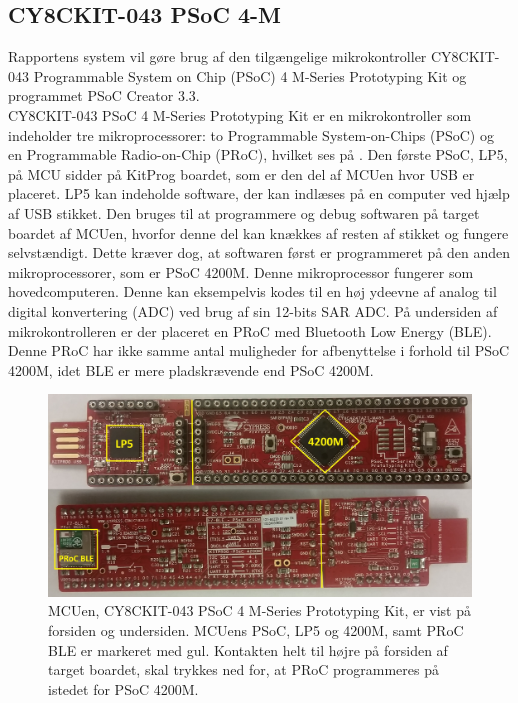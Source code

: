 \subsection{CY8CKIT-043 PSoC 4-M}
Rapportens system vil gøre brug af den tilgængelige mikrokontroller CY8CKIT-043 Programmable System on Chip (PSoC) 4 M-Series Prototyping Kit og programmet PSoC Creator 3.3.\\
CY8CKIT-043 PSoC 4 M-Series Prototyping Kit er en mikrokontroller som indeholder tre mikroprocessorer: to Programmable System-on-Chips (PSoC) og en Programmable Radio-on-Chip (PRoC), hvilket ses på . Den første PSoC, LP5, på MCU sidder på KitProg boardet, som er den del af MCUen hvor USB er placeret. LP5 kan indeholde software, der kan indlæses på en computer ved hjælp af USB stikket. Den bruges til at programmere og debug softwaren på target boardet af MCUen, hvorfor denne del kan knækkes af resten af stikket og fungere selvstændigt. Dette kræver dog, at softwaren først er programmeret på den anden mikroprocessorer, som er PSoC 4200M. Denne mikroprocessor fungerer som hovedcomputeren. Denne kan eksempelvis kodes til en høj ydeevne af analog til digital konvertering (ADC) ved brug af sin 12-bits SAR ADC. \newline
På undersiden af mikrokontrolleren er der placeret en PRoC med Bluetooth Low Energy (BLE). Denne PRoC har ikke samme antal muligheder for afbenyttelse i forhold til PSoC 4200M, idet BLE er mere pladskrævende end PSoC 4200M. \citep{CYPRESS2016PSoC,Semiconductor2016,CYPRESS2016Cortexm0}
%
\begin{figure}[H]
	\centering
	\includegraphics[scale=0.15]{figures/bProblemloesning/PSoC3.jpg}
	\caption{MCUen, CY8CKIT-043 PSoC 4 M-Series Prototyping Kit, er vist på forsiden og undersiden. MCUens PSoC, LP5 og 4200M, samt PRoC BLE er markeret med gul.\newline
	 Kontakten helt til højre på forsiden af target boardet, skal trykkes ned for, at PRoC programmeres på istedet for PSoC 4200M. \citep{CYPRESS2016PSoC,Semiconductor2016}}
	\label{fig:PSoC}
\end{figure}\vspace{-0.2cm}
